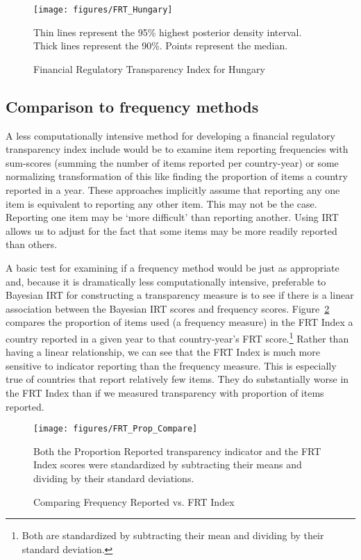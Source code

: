 \documentclass[a4paper]{article}
\begin{document}

\begin{figure}
    \caption{Financial Regulatory Transparency Index for Hungary}
    \label{FRTHungary}
    \begin{center}
        \texttt{[image: figures/FRT\_Hungary]}
    \end{center}
    {\scriptsize{Thin lines represent the 95\% highest posterior density interval. Thick lines represent the 90\%. Points represent the median.}}
\end{figure}

\subsection{Comparison to frequency methods}

A less computationally intensive method for developing a financial regulatory transparency index include would be to examine item reporting frequencies with sum-scores (summing the number of items reported per country-year) or some normalizing transformation of this like finding the proportion of items a country reported in a year. These approaches implicitly assume that reporting any one item is equivalent to reporting any other item. This may not be the case. Reporting one item may be `more difficult' than reporting another. Using IRT allows us to adjust for the fact that some items may be more readily reported than others. 

A basic test for examining if a frequency method would be just as appropriate and, because it is dramatically less computationally intensive, preferable to Bayesian IRT for constructing a transparency measure is to see if there is a linear association between the Bayesian IRT scores and frequency scores. Figure~\ref{CompFreqFRT} compares the proportion of items used (a frequency measure) in the FRT Index a country reported in a given year to that country-year's FRT score.\footnote{Both are standardized by subtracting their mean and dividing by their standard deviation.} Rather than having a linear relationship, we can see that the FRT Index is much more sensitive to indicator reporting than the frequency measure. This is especially true of countries that report relatively few items. They do substantially worse in the FRT Index than if we measured transparency with proportion of items reported.

\begin{figure}
    \caption{Comparing Frequency Reported vs. FRT Index}
    \label{CompFreqFRT}
    \begin{center}
        \texttt{[image: figures/FRT\_Prop\_Compare]} 
    \end{center}
    {\scriptsize{Both the Proportion Reported transparency indicator and the FRT Index scores were standardized by subtracting their means and dividing by their standard deviations.}}
\end{figure}
\end{document}
